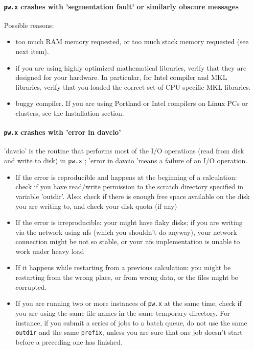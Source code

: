 \documentclass[12pt,a4paper]{article}
\def\pw.x{\texttt{pw.x}}
\begin{document}
\paragraph{\pw.x crashes with 'segmentation fault' or similarly
  obscure messages} 
Possible reasons:
\begin{itemize}
\item  too much RAM memory requested, or too much stack memory
  requested (see next item). 
\item if you are using highly optimized mathematical libraries, verify
  that they are designed for your hardware. In particular, for Intel
  compiler  and MKL libraries, verify that you loaded the correct set
  of CPU-specific MKL libraries. 
\item buggy compiler. If you are using Portland or Intel compilers on
  Linux PCs or clusters, see the Installation section. 
\end{itemize}

\paragraph{\pw.x crashes with 'error in davcio'}
'davcio' is the routine that performs most of the I/O operations (read
from disk and write to disk) in \pw.x ; 'error in davcio 'means a
failure of an I/O operation.  
\begin{itemize}
\item If the error is reproducible and happens at the beginning of a
  calculation: check if you have read/write permission to the scratch
  directory specified in variable 'outdir'. Also: check if there is
  enough free space available on the disk you are writing to, and
  check your disk quota (if any) 
\item If the error is irreproducible: your might have flaky disks; if
  you are writing via the network using nfs (which you shouldn't do
  anyway), your network connection might be not so stable, or your nfs
  implementation is unable to work under heavy load 
\item If it happens while restarting from a previous calculation: you
  might be restarting from the wrong place, or from wrong  data, or
  the files might be corrupted. 
\item If you are running two or more instances of \texttt{pw.x} at
  the same time, check if you are using the same file names in the 
  same temporary directory. For instance, if you submit a series of
  jobs to a batch queue, do not use the same \texttt{outdir} and
  the same \texttt{prefix}, unless you are sure that one job doesn't
  start before a preceding one has finished.
\end{itemize}
\end{document}
